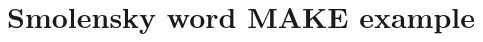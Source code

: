 \documentclass[a4paper,12pt,oneside,onecolumn,final,fleqn]{config/UERJ/repUERJ}
\begin{document}

%

\mainmatter


%
%
%
%
%



%

\chapter{Smolensky word MAKE example}%
\label{appen:smolensky-make}%




%

%


\end{document}
